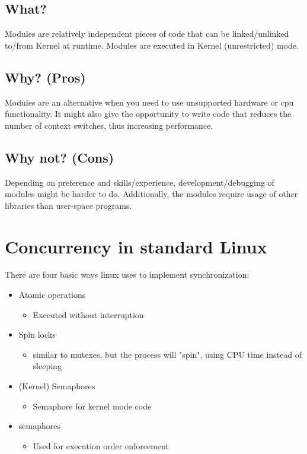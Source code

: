 \subsection{What?}
Modules are relatively independent pieces of code that can be linked/unlinked to/from Kernel at runtime. Modules are executed in Kernel (unrestricted) mode.

\subsection{Why? (Pros)}
Modules are an alternative when you need to use unsupported hardware or cpu functionality. It might also give the opportunity to write code that reduces the number of context switches, thus increasing performance.

\subsection{Why not? (Cons) }
Depending on preference and skills/experience, development/debugging of modules might be harder to do. Additionally, the modules require usage of other libraries than user-space programs.



\section{Concurrency in standard Linux}
There are four basic ways linux uses to implement synchronization:
\begin{itemize}
    \item Atomic operations
        \begin{itemize}
            \item Executed without interruption 
        \end{itemize}
    \item Spin locks
        \begin{itemize}
            \item similar to mutexes, but the process will "spin", using CPU time instead of sleeping
        \end{itemize}
    \item (Kernel) Semaphores
        \begin{itemize}
            \item Semaphore for kernel mode code 
        \end{itemize}
    \item semaphores
        \begin{itemize}
            \item Used for execution order enforcement
        \end{itemize}
\end{itemize}


